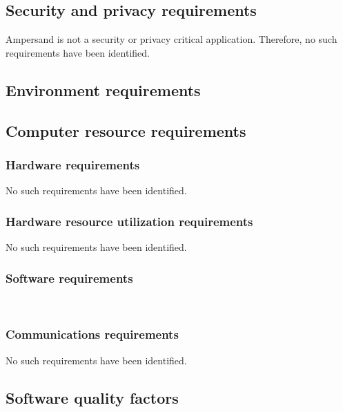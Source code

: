 \subsection{Security and privacy requirements}
Ampersand is not a security or privacy critical application.
Therefore, no such requirements have been identified.

\subsection{Environment requirements}

\subsection{Computer resource requirements}
	\subsubsection{Hardware requirements}
	No such requirements have been identified.

	\subsubsection{Hardware resource utilization requirements}
	No such requirements have been identified.

	\subsubsection{Software requirements}
	\\
		

	\subsubsection{Communications requirements}
	No such requirements have been identified.

\subsection{Software quality factors}


